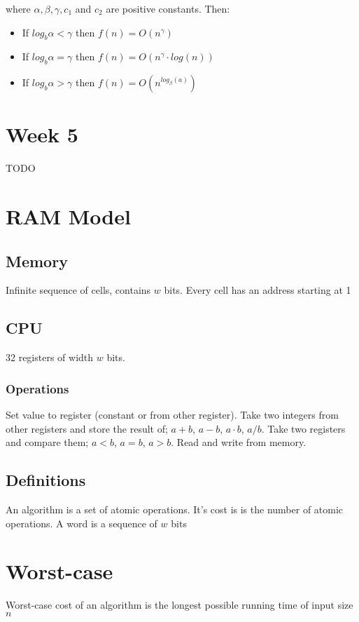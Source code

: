 \documentclass[1pt,a4paper]{article}
\begin{document}
\begin{multicols}{3}
where $\alpha, \beta, \gamma, c_1$ and $c_2$ are positive constants. Then:

\begin{itemize}
\item If $log_{b} \alpha < \gamma$ then $f(n) = O(n^\gamma)$
\item If $log_{b} \alpha = \gamma$ then $f(n) = O(n^\gamma \cdot log(n))$
\item If $log_{b} \alpha > \gamma$ then $f(n) = O(n^{log_\beta(a)})$

\end{itemize}
\section{Week 5}

TODO

\section{RAM Model}
\subsection{Memory}
Infinite sequence of cells, contains $w$ bits. Every cell has an address starting at 1
\subsection{CPU}
32 registers of width $w$ bits.
\subsubsection{Operations}
Set value to register (constant or from other register). Take two integers from other registers and store the result of; $a+b$, $a-b$, $a\cdot b$, $a/b$. Take two registers and compare them; $a<b$, $a=b$, $a>b$. Read and write from memory.
\subsection{Definitions}
An algorithm is a set of atomic operations. It's cost is is the number of atomic operations. A word is a sequence of $w$ bits
\section{Worst-case}
Worst-case cost of an algorithm is the longest possible running time of input size $n$

\end{multicols}
\end{document}
